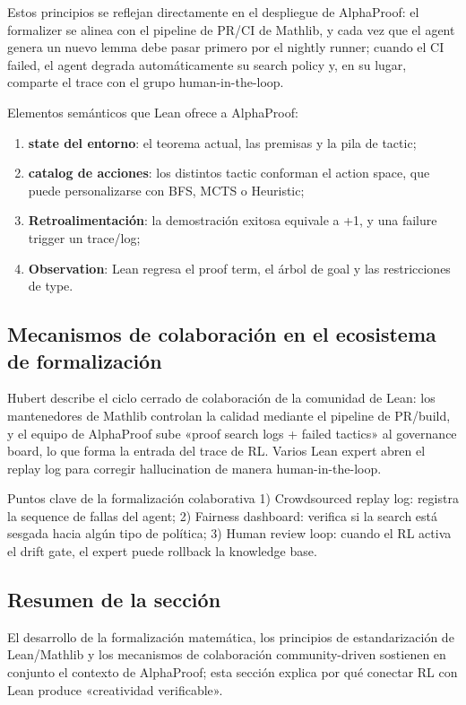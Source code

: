 \documentclass[a4paper]{article}
\begin{document}
Estos principios se reflejan directamente en el despliegue de AlphaProof: el formalizer se alinea con el pipeline de PR/CI de Mathlib, y cada vez que el agent genera un nuevo lemma debe pasar primero por el nightly runner; cuando el CI failed, el agent degrada automáticamente su search policy y, en su lugar, comparte el trace con el grupo human-in-the-loop.

Elementos semánticos que Lean ofrece a AlphaProof:
\begin{enumerate}
    \item \textbf{state del entorno}: el teorema actual, las premisas y la pila de tactic;
    \item \textbf{catalog de acciones}: los distintos tactic conforman el action space, que puede personalizarse con BFS, MCTS o Heuristic;
    \item \textbf{Retroalimentación}: la demostración exitosa equivale a +1, y una failure trigger un trace/log;
    \item \textbf{Observation}: Lean regresa el proof term, el árbol de goal y las restricciones de type.
\end{enumerate}

\subsection{Mecanismos de colaboración en el ecosistema de formalización}
Hubert describe el ciclo cerrado de colaboración de la comunidad de Lean: los mantenedores de Mathlib controlan la calidad mediante el pipeline de PR/build, y el equipo de AlphaProof sube «proof search logs + failed tactics» al governance board, lo que forma la entrada del trace de RL. Varios Lean expert abren el replay log para corregir hallucination de manera human-in-the-loop.

\begin{knowledgebox}{Puntos clave de la formalización colaborativa}
1) Crowdsourced replay log: registra la sequence de fallas del agent; 2) Fairness dashboard: verifica si la search está sesgada hacia algún tipo de política; 3) Human review loop: cuando el RL activa el drift gate, el expert puede rollback la knowledge base.
\end{knowledgebox}

\subsection{Resumen de la sección}
El desarrollo de la formalización matemática, los principios de estandarización de Lean/Mathlib y los mecanismos de colaboración community-driven sostienen en conjunto el contexto de AlphaProof; esta sección explica por qué conectar RL con Lean produce «creatividad verificable».
\newpage
\end{document}
